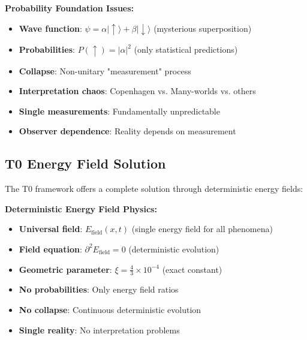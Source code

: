 \documentclass[12pt,a4paper]{report}
\begin{document}
	\begin{tcolorbox}[colback=red!5!white,colframe=red!75!black,title=Standard QM Problems]
		\textbf{Probability Foundation Issues:}
		\begin{itemize}
			\item \textbf{Wave function}: $\psi = \alpha|\uparrow\rangle + \beta|\downarrow\rangle$ (mysterious superposition)
			\item \textbf{Probabilities}: $P(\uparrow) = |\alpha|^2$ (only statistical predictions)
			\item \textbf{Collapse}: Non-unitary "measurement" process
			\item \textbf{Interpretation chaos}: Copenhagen vs. Many-worlds vs. others
			\item \textbf{Single measurements}: Fundamentally unpredictable
			\item \textbf{Observer dependence}: Reality depends on measurement
		\end{itemize}
	\end{tcolorbox}
	
	\subsection{T0 Energy Field Solution}
	\label{subsec:t0_solution}
	
	The T0 framework offers a complete solution through deterministic energy fields:
	
	\begin{tcolorbox}[colback=blue!5!white,colframe=blue!75!black,title=T0 Deterministic Foundation]
		\textbf{Deterministic Energy Field Physics:}
		\begin{itemize}
			\item \textbf{Universal field}: $E_{\text{field}}(x,t)$ (single energy field for all phenomena)
			\item \textbf{Field equation}: $\partial^2 E_{\text{field}} = 0$ (deterministic evolution)
			\item \textbf{Geometric parameter}: $\xi = \frac{4}{3} \times 10^{-4}$ (exact constant)
			\item \textbf{No probabilities}: Only energy field ratios
			\item \textbf{No collapse}: Continuous deterministic evolution
			\item \textbf{Single reality}: No interpretation problems
		\end{itemize}
	\end{tcolorbox}
	
\end{document}
